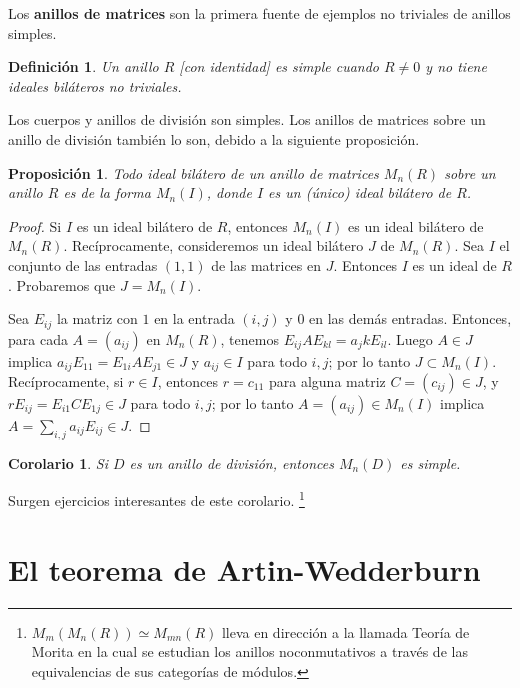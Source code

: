 \documentclass{article}
\newtheorem{definition}{Definición}[section]
\newtheorem{corollary}{Corolario}[section]
\newtheorem{proposition}{Proposición}[section]
\begin{document}
Los \textbf{anillos de matrices} son la primera fuente de ejemplos no triviales de anillos simples.

\begin{definition}
    Un anillo $R$ [con identidad] es simple cuando $R \neq 0$ y no tiene ideales biláteros no triviales.
\end{definition}

Los cuerpos y anillos de división son simples. Los anillos de matrices sobre un anillo de división también lo son, debido a la siguiente proposición.

\begin{proposition}
    Todo ideal bilátero de un anillo de matrices $M_n(R)$ sobre un anillo $R$ es de la forma $M_n(I)$, donde $I$ es un (único) ideal bilátero de $R$.
\end{proposition}

\begin{proof}
    Si $I$ es un ideal bilátero de $R$, entonces $M_n(I)$ es un ideal bilátero de $M_n(R)$.
    Recíprocamente, consideremos un ideal bilátero $J$ de $M_n(R)$.
    Sea $I$ el conjunto de las entradas $(1,1)$ de las matrices en $J$.
    Entonces $I$ es un ideal de $R$.
    Probaremos que $J = M_n(I)$.

    Sea $E_{ij}$ la matriz con $1$ en la entrada $(i,j)$ y $0$ en las demás entradas.
    Entonces, para cada $A = (a_{ij})$ en $M_n(R)$, tenemos $E_{ij} A E_{kl} = a_jk E_{il}$.
    Luego $A \in J$ implica $a_{ij} E_{1 1} = E_{1 i} A E_{j 1} \in J$ y $a_{ij} \in I$ para todo $i,j$; por lo tanto $J \subset M_n(I)$.
    Recíprocamente, si $r \in I$, entonces $r = c_{1 1}$ para alguna matriz $C = (c_{i j}) \in J$, y $r E_{i j} = E_{i 1} C E_{1 j} \in J$ para todo $i,j$; por lo tanto $A = (a_{ij}) \in M_n(I)$ implica $A = \sum_{i,j} a_{ij} E_{i j} \in J$.
\end{proof}

\begin{corollary}
    Si $D$ es un anillo de división, entonces $M_n(D)$ es simple.
\end{corollary}

Surgen ejercicios interesantes de este corolario.
\footnote{$M_m(M_n(R)) \simeq M_{mn}(R)$ lleva en dirección a la llamada Teoría de Morita en la cual se estudian los anillos noconmutativos a través de las equivalencias de sus categorías de módulos.}

\section{El teorema de Artin-Wedderburn}
\end{document}
